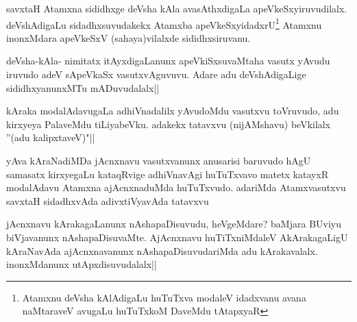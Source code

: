 \begin{artha}
savxtaH Atamxna sididhxge deVsha kAla avasAthxdigaLa apeVkeSxyiruvudilalx. deVshAdigaLu sidadhxsuvudakekx Atamxba apeVkeSxyidadxrU\footnote[1]{Atamxnu deVsha kAlAdigaLu huTuTxva modaleV idadxvanu avana naMtaraveV avugaLu huTuTxkoM\- DaveMdu tAtapxyaR} Atamxnu inonxMdara apeVkeSxV (sahaya)vilalxde sididhxsiruvanu.
\end{artha}


\begin{artha}
deVsha-kAla- nimitatx itAyxdigaLanunx apeVkiSxsuvaMtaha vasutx yAvudu iruvudo adeV sApeVkaSx vasutxvAguvuvu. Adare adu deVshAdigaLige sididhxyanunxMTu mADuvudalalx||
\end{artha}


\begin{artha}
kAraka modalAdavugaLa adhiVnadalilx yAvudoMdu vasutxvu toVruvudo, adu kirxyeya PalaveMdu tiLiyabeVku. adakekx tatavxvu (nijAMshavu) beVkilalx ''(adu kalipxtaveV)"||
\end{artha}


\begin{artha}
yAva kAraNadiMDa jAcnxnavu vasutxvanunx anusarisi baruvudo hAgU samasatx kirxyegaLu kataqRvige adhiVnavAgi huTuTxvavo matetx katayxR modalAdavu Atamxna ajAcnxnaduMda huTuTxvudo. adariMda Atamxvasutxvu savxtaH sidadhxvAda adivxtiVyavAda tatavxvu 
\end{artha}

\begin{artha}
jAcnxnavu kArakagaLanunx nAshapaDisuvudu, heVgeMdare? baMjara BUviyu biVjavanunx nAshapaDisuvaMte. AjAcnxnavu huTiTxniMdaleV AkArakagaLigU kAraNavAda ajAcnxnavanunx nAshapaDisuvudariMda adu kArakavalalx. inonxMdanunx utApxdisuvudalalx||
\end{artha}

\begin{artha}%

\end{artha}
